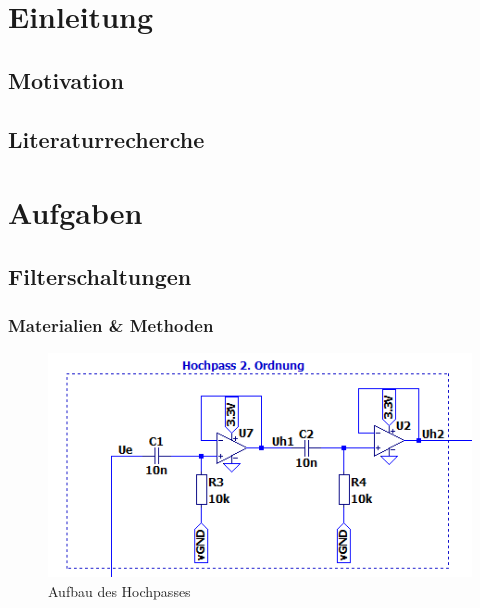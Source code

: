\clearpage
\section{Einleitung}

\subsection{Motivation}

\subsection{Literaturrecherche}


\clearpage
\section{Aufgaben}

\subsection{Filterschaltungen}

\subsubsection{Materialien \& Methoden}

\begin{figure}[htb]
    \includegraphics[width=16cm]{./pictures/Hochpass}
    \caption{Aufbau des Hochpasses}
    \label{fig:Hochpass}
\end{figure}

